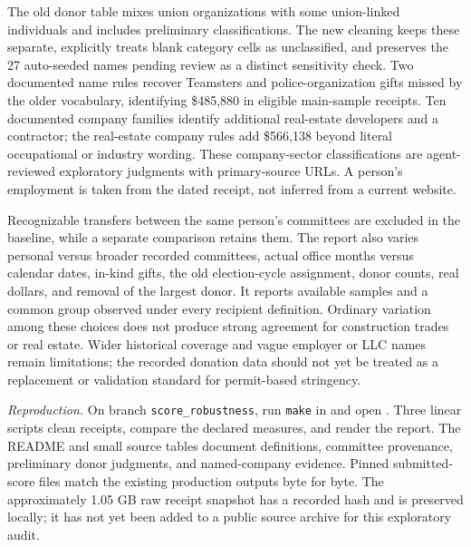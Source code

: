 The old donor table mixes union organizations with some union-linked individuals and includes preliminary classifications. The new cleaning keeps these separate, explicitly treats blank category cells as unclassified, and preserves the 27 auto-seeded names pending review as a distinct sensitivity check. Two documented name rules recover Teamsters and police-organization gifts missed by the older vocabulary, identifying \$485,880 in eligible main-sample receipts. Ten documented company families identify additional real-estate developers and a contractor; the real-estate company rules add \$566,138 beyond literal occupational or industry wording. These company-sector classifications are agent-reviewed exploratory judgments with primary-source URLs. A person's employment is taken from the dated receipt, not inferred from a current website.

Recognizable transfers between the same person's committees are excluded in the baseline, while a separate comparison retains them. The report also varies personal versus broader recorded committees, actual office months versus calendar dates, in-kind gifts, the old election-cycle assignment, donor counts, real dollars, and removal of the largest donor. It reports available samples and a common group observed under every recipient definition. Ordinary variation among these choices does not produce strong agreement for construction trades or real estate. Wider historical coverage and vague employer or LLC names remain limitations; the recorded donation data should not yet be treated as a replacement or validation standard for permit-based stringency.

\textit{Reproduction.} On branch \texttt{score\_robustness}, run \texttt{make} in
 and open
. Three linear scripts clean receipts,
compare the declared measures, and render the report. The README and small
source tables document definitions, committee provenance, preliminary donor
judgments, and named-company evidence. Pinned submitted-score files match
the existing production outputs byte for byte. The approximately 1.05 GB
raw receipt snapshot has a recorded hash and is preserved locally; it has
not yet been added to a public source archive for this exploratory audit.
